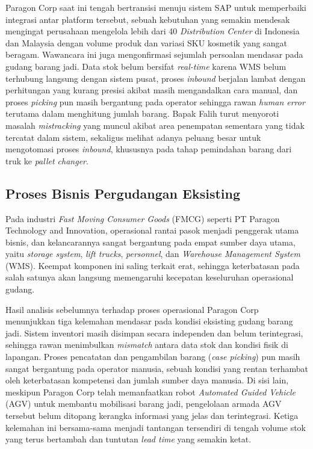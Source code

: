 Paragon Corp saat ini tengah bertransisi menuju sistem SAP untuk memperbaiki integrasi antar platform tersebut, sebuah kebutuhan yang semakin mendesak mengingat perusahaan mengelola lebih dari 40 \textit{Distribution Center} di Indonesia dan Malaysia dengan volume produk dan variasi SKU kosmetik yang sangat beragam. Wawancara ini juga mengonfirmasi sejumlah persoalan mendasar pada gudang barang jadi. Data stok belum bersifat \textit{real-time} karena WMS belum terhubung langsung dengan sistem pusat, proses \textit{inbound} berjalan lambat dengan perhitungan yang kurang presisi akibat masih mengandalkan cara manual, dan proses \textit{picking} pun masih bergantung pada operator sehingga rawan \textit{human error} terutama dalam menghitung jumlah barang. Bapak Falih turut menyoroti masalah \textit{mistracking} yang muncul akibat area penempatan sementara yang tidak tercatat dalam sistem, sekaligus melihat adanya peluang besar untuk mengotomasi proses \textit{inbound}, khususnya pada tahap pemindahan barang dari truk ke \textit{pallet changer}.

\subsection{Proses Bisnis Pergudangan Eksisting}
Pada industri \textit{Fast Moving Consumer Goods} (FMCG) seperti PT Paragon Technology and Innovation, operasional rantai pasok menjadi penggerak utama bisnis, dan kelancarannya sangat bergantung pada empat sumber daya utama, yaitu \textit{storage system}, \textit{lift trucks}, \textit{personnel}, dan \textit{Warehouse Management System} (WMS). Keempat komponen ini saling terkait erat, sehingga keterbatasan pada salah satunya akan langsung memengaruhi kecepatan keseluruhan operasional gudang.

Hasil analisis sebelumnya terhadap proses operasional Paragon Corp menunjukkan tiga kelemahan mendasar pada kondisi eksisting gudang barang jadi. Sistem inventori masih disimpan secara independen dan belum terintegrasi, sehingga rawan menimbulkan \textit{mismatch} antara data stok dan kondisi fisik di lapangan. Proses pencatatan dan pengambilan barang (\textit{case picking}) pun masih sangat bergantung pada operator manusia, sebuah kondisi yang rentan terhambat oleh keterbatasan kompetensi dan jumlah sumber daya manusia. Di sisi lain, meskipun Paragon Corp telah memanfaatkan robot \textit{Automated Guided Vehicle} (AGV) untuk membantu mobilisasi barang jadi, pengelolaan armada AGV tersebut belum ditopang kerangka informasi yang jelas dan terintegrasi. Ketiga kelemahan ini bersama-sama menjadi tantangan tersendiri di tengah volume stok yang terus bertambah dan tuntutan \textit{lead time} yang semakin ketat.

